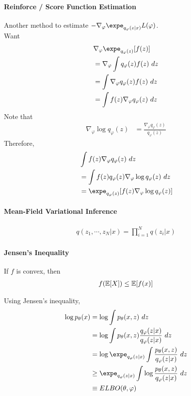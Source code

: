 \documentclass{article}
\begin{document}
	\paragraph{Reinforce / Score Function Estimation} Another method to estimate $- \nabla_\varphi \expe_{q_\varphi(z|x)} L(\varphi)$.\\
	Want
	\begin{align}
		&\nabla_\varphi \expe_{q_\varphi(z)} [f(z)] \\
		&= \nabla_\varphi \int q_\varphi(z) f(z)\ dz \\
		&= \int \nabla_\varphi q_\varphi(z) f(z)\ dz \\
		&= \int f(z) \nabla_\varphi q_\varphi(z) \ dz
	\end{align}
	Note that
	\begin{align}
		\nabla_\varphi \log q_\varphi(z) &= \frac{\nabla_\varphi q_\varphi(z)}{q_\varphi(z)}
	\end{align}
	Therefore,
	\begin{align}
		&\int f(z) \nabla_\varphi q_\varphi(z) \ dz \\
		&= \int f(z) q_\varphi(z) \nabla_\varphi \log q_\varphi(z) \ dz \\
		&= \expe_{q_\varphi(z)}[ f(z) \nabla_\varphi \log q_\varphi(z)]
	\end{align}
	
	\paragraph{Mean-Field Variational Inference}
	\begin{align}
		q(z_1, \cdots, z_N|x) = \prod_{i=1}^N q(z_i|x)
	\end{align}

	\paragraph{Jensen's Inequality}
	\begin{theorem}
		If $f$ is convex, then
		\begin{align}
			f(\mathbb{E}[{X}]) \leq \mathbb{E}[{f(x)}]
		\end{align}
	\end{theorem}
	Using Jensen's inequality,
	\begin{align}
		\log p_\theta(x) &= \log \int p_\theta(x, z)\ dz \\
		&= \log \int p_\theta(x,z) \frac{q_\varphi(z|x)}{q_\varphi(z|x)}\ dz \\
		&= \log \expe_{q_\varphi(z|x)} \int \frac{p_\theta(x,z)}{q_\varphi(z|x)}\ dz \\
		&\geq \expe_{q_\varphi(z|x)} \int \log \frac{p_\theta(x,z)}{q_\varphi(z|x)}\ dz \\
		&\equiv ELBO(\theta, \varphi)
	\end{align}
	
\end{document}
